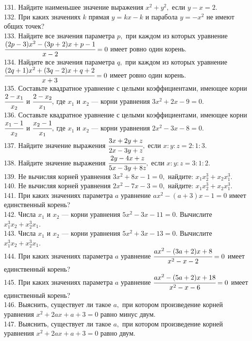 \documentclass[12pt]{article}
\begin{document}
131. Найдите наименьшее значение выражения $x^2+y^2,$ если $y-x=2.$\\
132. При каких значениях $k$ прямая $y=kx-k$ и парабола $y=-x^2$ не имеют общих точек?\\
133. Найдите все значения параметра $p,$ при каждом из которых уравнение\\ $\cfrac{(2p-3)x^2-(3p+2)x+p-1}{x-2}=0$ имеет ровно один корень.\\
134. Найдите все значения параметра $q,$ при каждом из которых уравнение\\ $\cfrac{(2q+1)x^2+(3q-2)x+q+2}{x+3}=0$ имеет ровно один корень.\\
135. Составьте квадратное уравнение с целыми коэффициентами, имеющее корни $\cfrac{2-x_1}{x_2}$ и $\cfrac{2-x_2}{x_1},$ где $x_1$ и $x_2$ --- корни уравнения $3x^2+2x-9=0.$\\
136. Составьте квадратное уравнение с целыми коэффициентами, имеющее корни $\cfrac{x_1-1}{x_2}$ и $\cfrac{x_2-1}{x_1},$ где $x_1$ и $x_2$ --- корни уравнения $2x^2-3x-8=0.$\\
137. Найдите значение выражения $\cfrac{3x+2y+z}{2x-3y+z},$ если $x:y:z=2:1:3.$\\
138. Найдите значение выражения $\cfrac{2y-4x+z}{5x-3y+8z},$ если $x:y:z=3:1:2.$\\
139. Не вычисляя корней уравнения $3x^2+8x-1=0,$ найдите: $x_1x_2^3+x_2x_1^3.$\\
140. Не вычисляя корней уравнения $2x^2-7x-3=0,$ найдите: $x_1x_2^3+x_2x_1^3.$\\
141. При каких значениях параметра $a$ уравнение $ax^2-(a+3)x-1=0$ имеет единственный корень?\\
142. Числа $x_1$ и $x_2$ --- корни уравнения $5x^2-3x-11=0.$ Вычислите $x_1^3x_2+x_2^3x_1.$\\
143. Числа $x_1$ и $x_2$ --- корни уравнения $5x^2+3x-13=0.$ Вычислите $x_1^3x_2+x_2^3x_1.$\\
144. При каких значениях параметра $a$ уравнение $\cfrac{ax^2-(3a+2)x+8}{x^2-x-2}=0$ имеет единственный корень?\\
145. При каких значениях параметра $a$ уравнение $\cfrac{ax^2-(5a+2)x+18}{x^2-x-6}=0$ имеет единственный корень?\\
146. Выяснить, существует ли такое $a,$ при котором произведение корней уравнения $x^2+2ax+a+3=0$ равно минус двум.\\
147. Выяснить, существует ли такое $a,$ при котором произведение корней уравнения $x^2+2ax+a+3=0$ равно двум.
\newpage
\end{document}
